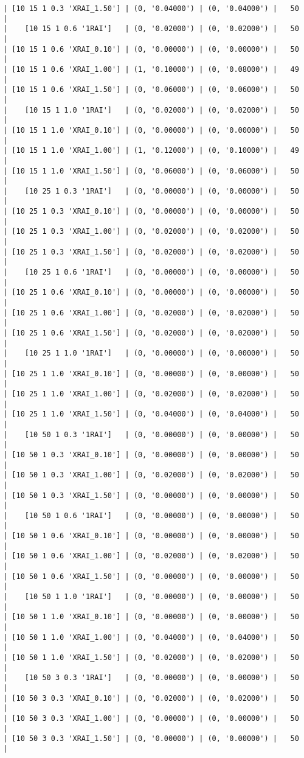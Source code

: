 \documentclass{article}
\begin{document}
\begin{verbatim}
| [10 15 1 0.3 'XRAI_1.50'] | (0, '0.04000') | (0, '0.04000') |   50  |
|    [10 15 1 0.6 '1RAI']   | (0, '0.02000') | (0, '0.02000') |   50  |
| [10 15 1 0.6 'XRAI_0.10'] | (0, '0.00000') | (0, '0.00000') |   50  |
| [10 15 1 0.6 'XRAI_1.00'] | (1, '0.10000') | (0, '0.08000') |   49  |
| [10 15 1 0.6 'XRAI_1.50'] | (0, '0.06000') | (0, '0.06000') |   50  |
|    [10 15 1 1.0 '1RAI']   | (0, '0.02000') | (0, '0.02000') |   50  |
| [10 15 1 1.0 'XRAI_0.10'] | (0, '0.00000') | (0, '0.00000') |   50  |
| [10 15 1 1.0 'XRAI_1.00'] | (1, '0.12000') | (0, '0.10000') |   49  |
| [10 15 1 1.0 'XRAI_1.50'] | (0, '0.06000') | (0, '0.06000') |   50  |
|    [10 25 1 0.3 '1RAI']   | (0, '0.00000') | (0, '0.00000') |   50  |
| [10 25 1 0.3 'XRAI_0.10'] | (0, '0.00000') | (0, '0.00000') |   50  |
| [10 25 1 0.3 'XRAI_1.00'] | (0, '0.02000') | (0, '0.02000') |   50  |
| [10 25 1 0.3 'XRAI_1.50'] | (0, '0.02000') | (0, '0.02000') |   50  |
|    [10 25 1 0.6 '1RAI']   | (0, '0.00000') | (0, '0.00000') |   50  |
| [10 25 1 0.6 'XRAI_0.10'] | (0, '0.00000') | (0, '0.00000') |   50  |
| [10 25 1 0.6 'XRAI_1.00'] | (0, '0.02000') | (0, '0.02000') |   50  |
| [10 25 1 0.6 'XRAI_1.50'] | (0, '0.02000') | (0, '0.02000') |   50  |
|    [10 25 1 1.0 '1RAI']   | (0, '0.00000') | (0, '0.00000') |   50  |
| [10 25 1 1.0 'XRAI_0.10'] | (0, '0.00000') | (0, '0.00000') |   50  |
| [10 25 1 1.0 'XRAI_1.00'] | (0, '0.02000') | (0, '0.02000') |   50  |
| [10 25 1 1.0 'XRAI_1.50'] | (0, '0.04000') | (0, '0.04000') |   50  |
|    [10 50 1 0.3 '1RAI']   | (0, '0.00000') | (0, '0.00000') |   50  |
| [10 50 1 0.3 'XRAI_0.10'] | (0, '0.00000') | (0, '0.00000') |   50  |
| [10 50 1 0.3 'XRAI_1.00'] | (0, '0.02000') | (0, '0.02000') |   50  |
| [10 50 1 0.3 'XRAI_1.50'] | (0, '0.00000') | (0, '0.00000') |   50  |
|    [10 50 1 0.6 '1RAI']   | (0, '0.00000') | (0, '0.00000') |   50  |
| [10 50 1 0.6 'XRAI_0.10'] | (0, '0.00000') | (0, '0.00000') |   50  |
| [10 50 1 0.6 'XRAI_1.00'] | (0, '0.02000') | (0, '0.02000') |   50  |
| [10 50 1 0.6 'XRAI_1.50'] | (0, '0.00000') | (0, '0.00000') |   50  |
|    [10 50 1 1.0 '1RAI']   | (0, '0.00000') | (0, '0.00000') |   50  |
| [10 50 1 1.0 'XRAI_0.10'] | (0, '0.00000') | (0, '0.00000') |   50  |
| [10 50 1 1.0 'XRAI_1.00'] | (0, '0.04000') | (0, '0.04000') |   50  |
| [10 50 1 1.0 'XRAI_1.50'] | (0, '0.02000') | (0, '0.02000') |   50  |
|    [10 50 3 0.3 '1RAI']   | (0, '0.00000') | (0, '0.00000') |   50  |
| [10 50 3 0.3 'XRAI_0.10'] | (0, '0.02000') | (0, '0.02000') |   50  |
| [10 50 3 0.3 'XRAI_1.00'] | (0, '0.00000') | (0, '0.00000') |   50  |
| [10 50 3 0.3 'XRAI_1.50'] | (0, '0.00000') | (0, '0.00000') |   50  |

\end{verbatim}
\end{document}
